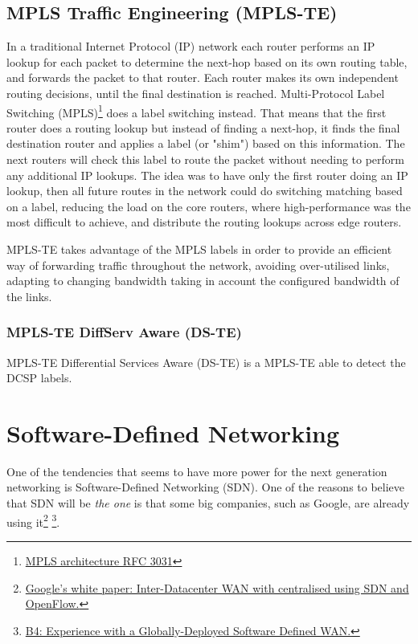 \subsection{MPLS Traffic Engineering (MPLS-TE)}
\label{sec:mpls-te}
In a traditional Internet Protocol (IP) network each router performs an IP lookup for each packet to determine the next-hop based on its own routing table, and forwards the packet to that router. Each router makes its own independent routing decisions, until the final destination is reached.
Multi-Protocol Label Switching (MPLS)\footnote{\href{http://www.ietf.org/rfc/rfc3031.txt}{MPLS architecture RFC 3031}} does a label switching instead. That means that the first router does a routing lookup but instead of finding a next-hop, it finds the final destination router and applies a label (or "shim") based on this information. The next routers will check this label to route the packet without needing to perform any additional IP lookups. The idea was to have only the first router doing an IP lookup, then all future routes in the network could do switching matching based on a label, reducing the load on the core routers, where high-performance was the most difficult to achieve, and distribute the routing lookups across edge routers.

MPLS-TE takes advantage of the MPLS labels in order to provide an efficient way of forwarding traffic throughout the network, avoiding over-utilised links, adapting to changing bandwidth taking in account the configured bandwidth of the links.

\subsubsection{MPLS-TE DiffServ Aware (DS-TE)}

MPLS-TE Differential Services Aware (DS-TE) is a MPLS-TE able to detect the DCSP labels.



\section{Software-Defined Networking}
\label{sec:sdn}

One of the tendencies that seems to have more power for the next generation networking is Software-Defined Networking (SDN). One of the reasons to believe that SDN will be \emph{the one} is that some big companies, such as Google, are already using it\footnote{\href{http://goo.gl/F6sBR}{Google's white paper: Inter-Datacenter WAN with centralised using SDN and OpenFlow.}} \footnote{\href{http://cseweb.ucsd.edu/~vahdat/papers/b4-sigcomm13.pdf}{B4: Experience with a Globally-Deployed Software Defined WAN.}}.

